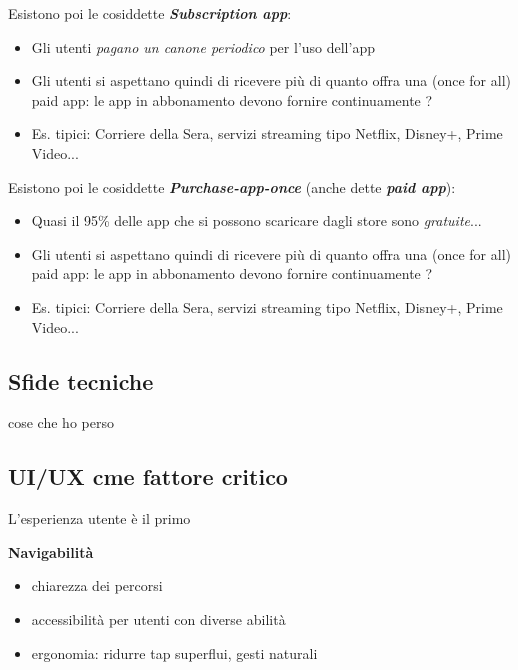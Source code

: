 \par Esistono poi le cosiddette \textbf{\textit{Subscription app}}:
\begin{itemize}
    \item Gli utenti \textit{pagano un canone periodico} per l'uso dell'app
    \item Gli utenti si aspettano quindi di ricevere più di quanto offra una (once for all) paid app: le app in abbonamento devono fornire continuamente ?
    \item Es. tipici: Corriere della Sera, servizi streaming tipo Netflix, Disney+, Prime Video...
\end{itemize}
\par Esistono poi le cosiddette \textbf{\textit{Purchase-app-once}} (anche dette \textbf{\textit{paid app}}):
\begin{itemize}
    \item Quasi il 95\% delle app che si possono scaricare dagli store sono \textit{gratuite}...
    \item Gli utenti si aspettano quindi di ricevere più di quanto offra una (once for all) paid app: le app in abbonamento devono fornire continuamente ?
    \item Es. tipici: Corriere della Sera, servizi streaming tipo Netflix, Disney+, Prime Video...
\end{itemize}

\subsection{Sfide tecniche}


cose che ho perso


\subsection{UI/UX cme fattore critico}
\par L'esperienza utente è il primo



\par \textbf{Navigabilità}
\begin{itemize}
    \item chiarezza dei percorsi
    \item accessibilità per utenti con diverse abilità 
    \item ergonomia: ridurre tap superflui, gesti naturali
\end{itemize}

